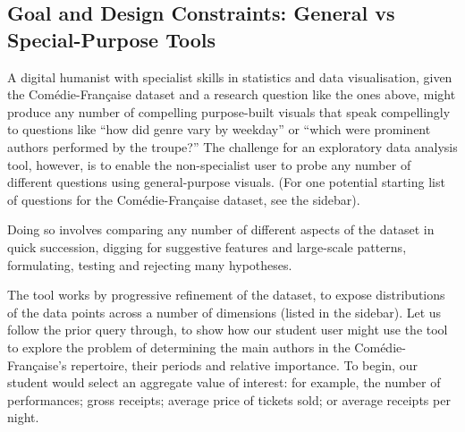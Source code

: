 \documentclass[	DIV=calc,%
							paper=a4,%
							fontsize=11pt,%
							twocolumn]{scrartcl}	 					%
\begin{document}
\subsection*{Goal and Design Constraints: General vs Special-Purpose Tools}

A digital humanist with specialist skills in statistics and data visualisation, given the Comédie-Française dataset and a research question like the ones above, might produce any number of compelling purpose-built visuals that speak compellingly to questions like ``how did genre vary by weekday'' or ``which were prominent authors performed by the troupe?''  The challenge for an exploratory data analysis tool, however, is to enable the non-specialist user to probe any number of different questions using general-purpose visuals.  (For one potential starting list of questions for the Comédie-Française dataset, see the sidebar).

Doing so involves comparing any number of different aspects of the dataset in quick succession, digging for suggestive features and large-scale patterns, formulating, testing and rejecting many hypotheses.

The tool works by progressive refinement of the dataset, to expose distributions of the data points across a number of dimensions (listed in the sidebar).  Let us follow the prior query through, to show how our student user might use the tool to explore the problem of determining the main authors in the Comédie-Française’s repertoire, their periods and relative importance.  To begin, our student would select an aggregate value of interest: for example, the number of performances; gross receipts; average price of tickets sold; or average receipts per night.
\end{document}
